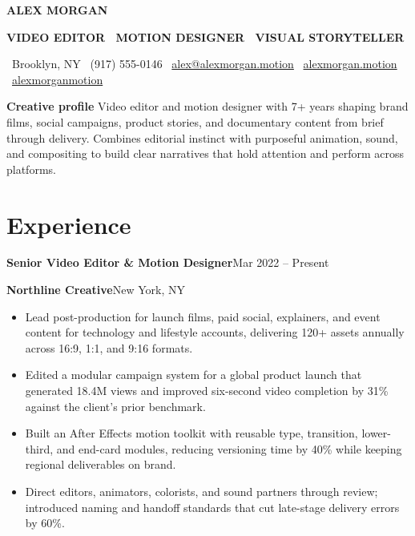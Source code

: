 \documentclass[10pt,letterpaper]{article}
\newcommand{\job}[4]{%
  \textbf{\color{ink}#1}\hfill{\small\color{slate}#4}\par
  {\color{accent}\textbf{#2}}{\color{slate}\enspace\textbar\enspace #3}\par
}
\begin{document}
\begin{center}
  {\fontsize{25}{28}\selectfont\bfseries\color{ink}ALEX MORGAN}\par
  \vspace{1pt}
  {\fontsize{11.5}{13}\selectfont\bfseries\color{accent}
    VIDEO EDITOR \textperiodcentered\ MOTION DESIGNER \textperiodcentered\ VISUAL STORYTELLER
  }\par
  \vspace{4pt}
  {\small\color{slate}
    \faMapMarker*\ Brooklyn, NY
    \quad\textbar\quad
    \faPhone*\ (917) 555-0146
    \quad\textbar\quad
    \faEnvelope\ \href{mailto:alex@alexmorgan.motion}{alex@alexmorgan.motion}
    \quad\textbar\quad
    \faGlobe\ \href{https://alexmorgan.motion}{alexmorgan.motion}
    \quad\textbar\quad
    \faLinkedin\ \href{https://linkedin.com/in/alexmorganmotion}{alexmorganmotion}
  }\par
\end{center}

\vspace{3pt}
\colorbox{soft}{%
  \parbox{\dimexpr\linewidth-2\fboxsep\relax}{%
    \small\color{ink}
    \textbf{Creative profile}\enspace
    Video editor and motion designer with 7+ years shaping brand films, social campaigns, product stories, and documentary content from brief through delivery. Combines editorial instinct with purposeful animation, sound, and compositing to build clear narratives that hold attention and perform across platforms.
  }%
}

\section{Experience}

\job{Senior Video Editor \& Motion Designer}{Northline Creative}{New York, NY}{Mar 2022 -- Present}
\begin{itemize}
  \item Lead post-production for launch films, paid social, explainers, and event content for technology and lifestyle accounts, delivering 120+ assets annually across 16:9, 1:1, and 9:16 formats.
  \item Edited a modular campaign system for a global product launch that generated 18.4M views and improved six-second video completion by 31\% against the client's prior benchmark.
  \item Built an After Effects motion toolkit with reusable type, transition, lower-third, and end-card modules, reducing versioning time by 40\% while keeping regional deliverables on brand.
  \item Direct editors, animators, colorists, and sound partners through review; introduced naming and handoff standards that cut late-stage delivery errors by 60\%.
\end{itemize}
\end{document}
